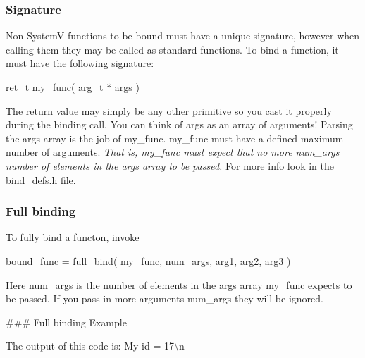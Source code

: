 \subsubsection*{Signature}

Non-\/\+SystemV functions to be bound must have a unique signature, however when calling them they may be called as standard functions. To bind a function, it must have the following signature\+: 
\begin{DoxyCode}
\hyperlink{bind__defs_8h_a54aeeb54a7a6a62c72ec8dc7718fdd91}{ret\_t} my\_func( \hyperlink{bind__defs_8h_aa409ee08129c587e002cf2062a09a744}{arg\_t} * args )
\end{DoxyCode}
 The return value may simply be any other primitive so you cast it properly during the binding call. You can think of {\ttfamily args} as an array of arguments! Parsing the {\ttfamily args} array is the job of {\ttfamily my\+\_\+func}. {\ttfamily my\+\_\+func} must have a defined maximum number of \textquotesingle{}arguments\textquotesingle{}. {\itshape That is, {\ttfamily my\+\_\+func} must expect that no more {\ttfamily num\+\_\+args} number of elements in the {\ttfamily args} array to be passed.} For more info look in the {\ttfamily \hyperlink{bind__defs_8h}{bind\+\_\+defs.\+h}} file.

\subsubsection*{Full binding}

To fully bind a functon, invoke 
\begin{DoxyCode}
bound\_func = \hyperlink{bind_8c_aba8492ffd71864427a5cddc0c3888454}{full\_bind}( my\_func, num\_args, arg1, arg2, arg3 )
\end{DoxyCode}
 Here {\ttfamily num\+\_\+args} is the number of elements in the {\ttfamily args} array {\ttfamily my\+\_\+func} expects to be passed. If you pass in more arguments {\ttfamily num\+\_\+args} they will be ignored.

\#\#\# Full binding Example 
 The output of this code is\+: {\ttfamily My id = 17\textbackslash{}n}

